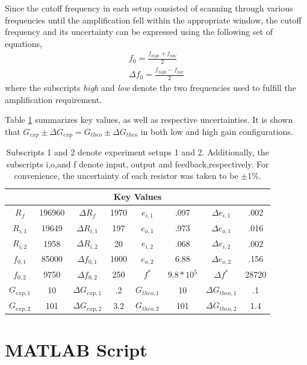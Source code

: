 \documentclass[letterpaper,12pt]{article}
\begin{document}
Since the cutoff frequency in each setup consisted of scanning through various frequencies until the amplification fell within the appropriate window, the cutoff frequency and its uncertainty can be expressed using the following set of equations,
\begin{equation}
    \begin{split}
        f_0 = \frac{f_{high} + f_{low}}{2}\\
        \Delta f_0 = \frac{f_{high} - f_{low}}{2}
    \end{split}
\end{equation}
where the subscripts \textit{high} and \textit{low} denote the two frequencies used to fulfill the amplification requirement.

Table \ref{KeyValues} summarizes key values, as well as respective uncertainties. It is shown that $G_{exp} \pm{\Delta G_{exp}} = G_{theo} \pm{\Delta G_{theo}}$ in both low and high gain configurations.
\begin{table}[ht]
    \centering
    \begin{tabular}{ c | c | c | c ||c | c | c | c }
    \multicolumn{8}{c}{Key Values} \\
    \hline
    $R_f$ & 196960 & $\Delta R_f$ & 1970 & $e_{i,1}$ & .097 & $\Delta e_{i,1}$ & .002  \\
    $R_{i,1}$ & 19649 & $\Delta R_{i,1}$ & 197 & $e_{o,1}$ & .973 & $\Delta e_{o,1}$ & .016    \\
    $R_{i,2}$ & 1958 & $\Delta R_{i,2}$ & 20 & $e_{i,2}$ & .068 & $\Delta e_{i,2}$ & .002     \\
    $f_{0,1}$ & 85000 & $\Delta f_{0,1}$ & 1000 & $e_{o,2}$ & 6.88 & $\Delta e_{o,2}$ & .156  \\
    $f_{0,2}$ & 9750 & $\Delta f_{0,2}$ & 250 &  $f^*$ & $9.8*10^{5}$ & $\Delta f^*$ & 28720  \\
    \hline
    $G_{exp,1}$ & 10 & $\Delta G_{exp,1}$ & .2 & $G_{theo,1}$ & 10 & $\Delta G_{theo,1}$ & .1 \\
    $G_{exp,2}$ & 101 & $\Delta G_{exp,2}$ & 3.2 & $G_{theo,2}$ & 101 & $\Delta G_{theo,2}$ & 1.4 
    \end{tabular}
    \caption{\small Subscripts 1 and 2 denote experiment setups 1 and 2. Additionally, the subscripts i,o,and f denote input, output and feedback,respectively. For convenience, the uncertainty of each resistor was taken to be $\pm{1\%}$.}
    \label{KeyValues}
\end{table}

\newpage
\appendix
\section{MATLAB Script}

\end{document}
